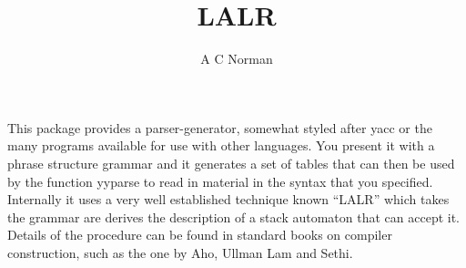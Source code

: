 \documentclass[12pt]{article}
\title{LALR}
\author{A C Norman}
\begin{document}
\maketitle
%
%

This package provides a parser-generator, somewhat styled after
{\ttfamily yacc} or the many programs available for use with other
languages. You present it with a phrase structure grammar and it
generates a set of tables that can then be used by the function
{\ttfamily yyparse} to read in material in the syntax that you specified.
Internally it uses a very well established technique known ``LALR'' which
takes the grammar are derives the description of a stack automaton that
can accept it. Details of the procedure can be found in standard books
on compiler construction, such as the one by Aho, Ullman Lam and Sethi.
\end{document}
